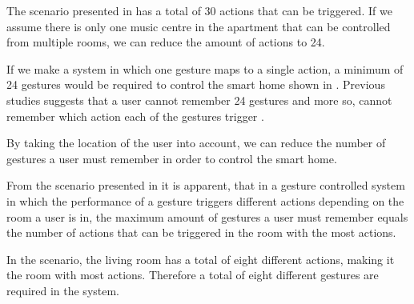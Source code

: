 The scenario presented in  has a total of 30 actions that can be triggered. If we assume there is only one music centre in the apartment that can be controlled from multiple rooms, we can reduce the amount of actions to 24.

If we make a system in which one gesture maps to a single action, a minimum of 24 gestures would be required to control the smart home shown in . Previous studies suggests that a user cannot remember 24 gestures and more so, cannot remember which action each of the gestures trigger \cite{Kela2006,miller1956magical}.

By taking the location of the user into account, we can reduce the number of gestures a user must remember in order to control the smart home.

From the scenario presented in  it is apparent, that in a gesture controlled system in which the performance of a gesture triggers different actions depending on the room a user is in, the maximum amount of gestures a user must remember equals the number of actions that can be triggered in the room with the most actions.

In the scenario, the living room has a total of eight different actions, making it the room with most actions. Therefore a total of eight different gestures are required in the system.

